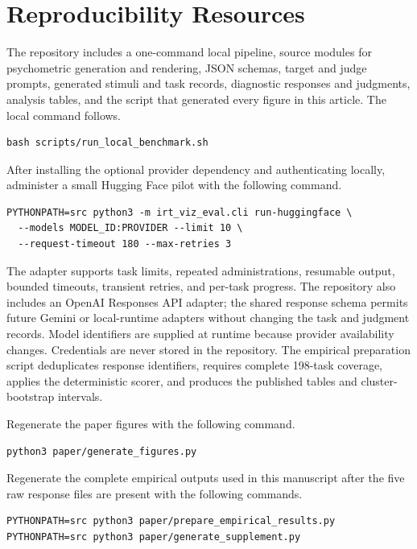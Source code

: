 \documentclass[12pt]{article}
\begin{document}
\section{Reproducibility Resources}

The repository includes a one-command local pipeline, source modules for psychometric generation and rendering, JSON schemas, target and judge prompts, generated stimuli and task records, diagnostic responses and judgments, analysis tables, and the script that generated every figure in this article. The local command follows.

\begin{verbatim}
bash scripts/run_local_benchmark.sh
\end{verbatim}

After installing the optional provider dependency and authenticating locally, administer a small Hugging Face pilot with the following command.

\begin{verbatim}
PYTHONPATH=src python3 -m irt_viz_eval.cli run-huggingface \
  --models MODEL_ID:PROVIDER --limit 10 \
  --request-timeout 180 --max-retries 3
\end{verbatim}

The adapter supports task limits, repeated administrations, resumable output, bounded timeouts, transient retries, and per-task progress. The repository also includes an OpenAI Responses API adapter; the shared response schema permits future Gemini or local-runtime adapters without changing the task and judgment records. Model identifiers are supplied at runtime because provider availability changes. Credentials are never stored in the repository. The empirical preparation script deduplicates response identifiers, requires complete 198-task coverage, applies the deterministic scorer, and produces the published tables and cluster-bootstrap intervals.

Regenerate the paper figures with the following command.

\begin{verbatim}
python3 paper/generate_figures.py
\end{verbatim}

Regenerate the complete empirical outputs used in this manuscript after the five raw response files are present with the following commands.

\begin{verbatim}
PYTHONPATH=src python3 paper/prepare_empirical_results.py
PYTHONPATH=src python3 paper/generate_supplement.py
\end{verbatim}
\end{document}
